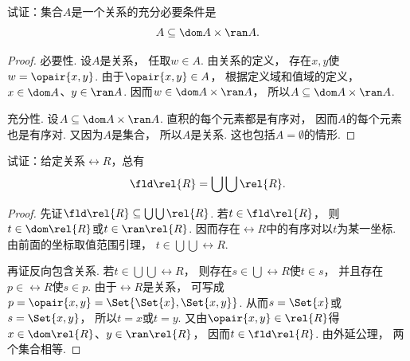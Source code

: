 \begin{example}
    试证：集合\(A\)是一个关系的充分必要条件是
    \begin{equation*}
        A \subseteq \dom A \times \ran A.
    \end{equation*}
    \begin{proof}
        必要性.
        设\(A\)是关系，
        任取\(w\in A\).
        由关系的定义，
        存在\(x,y\)使\(w=\opair{x,y}\).
        由于\(\opair{x,y}\in A\)，
        根据定义域和值域的定义，
        \(x\in\dom A\)、\(y\in\ran A\).
        因而\(w\in\dom A\times\ran A\)，
        所以\(A\subseteq\dom A\times\ran A\).

        充分性.
        设\(A\subseteq\dom A\times\ran A\).
        直积的每个元素都是有序对，
        因而\(A\)的每个元素也是有序对.
        又因为\(A\)是集合，
        所以\(A\)是关系.
        这也包括\(A=\emptyset\)的情形.
    \end{proof}
\end{example}

\begin{example}
    试证：给定关系\(\rel{R}\)，总有
    \begin{equation*}
        \fld \rel{R} = \bigcup\bigcup \rel{R}.
    \end{equation*}
    \begin{proof}
        先证\(\fld\rel{R}\subseteq\bigcup\bigcup\rel{R}\).
        若\(t\in\fld\rel{R}\)，
        则\(t\in\dom\rel{R}\)或\(t\in\ran\rel{R}\).
        因而存在\(\rel{R}\)中的有序对以\(t\)为某一坐标.
        由前面的坐标取值范围引理，
        \(t\in\bigcup\bigcup\rel{R}\).

        再证反向包含关系.
        若\(t\in\bigcup\bigcup\rel{R}\)，
        则存在\(s\in\bigcup\rel{R}\)使\(t\in s\)，
        并且存在\(p\in\rel{R}\)使\(s\in p\).
        由于\(\rel{R}\)是关系，
        可写成\(p=\opair{x,y}=\Set{\Set{x},\Set{x,y}}\).
        从而\(s=\Set{x}\)或\(s=\Set{x,y}\)，
        所以\(t=x\)或\(t=y\).
        又由\(\opair{x,y}\in\rel{R}\)得
        \(x\in\dom\rel{R}\)、\(y\in\ran\rel{R}\)，
        因而\(t\in\fld\rel{R}\).
        由外延公理，
        两个集合相等.
    \end{proof}
\end{example}

